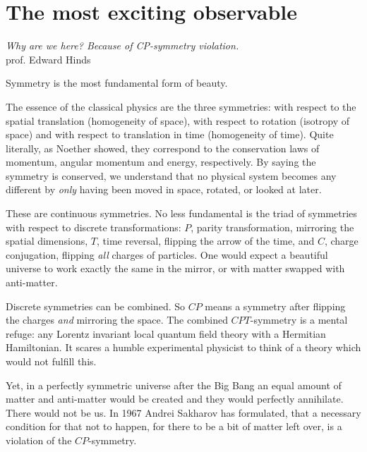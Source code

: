 \chapter{The most exciting observable}
\label{ch:nedm-at-psi}

\begin{center}
  \emph{Why are we here? Because of CP-symmetry violation.}\\
  prof. Edward Hinds
\end{center}

Symmetry is the most fundamental form of beauty.

The essence of the classical physics are the three symmetries: with respect to the spatial translation (homogeneity of space), with respect to rotation (isotropy of space) and with respect to translation in time (homogeneity of time). Quite literally, as Noether showed, they correspond to the conservation laws of momentum, angular momentum and energy, respectively. By saying the symmetry is conserved, we understand that no physical system becomes any different by \emph{only} having been moved in space, rotated, or looked at later.

These are continuous symmetries. No less fundamental is the triad of symmetries with respect to discrete transformations: $P$, parity transformation, mirroring the spatial dimensions, $T$, time reversal, flipping the arrow of the time, and $C$, charge conjugation, flipping \emph{all} charges of particles. One would expect a beautiful universe to work exactly the same in the mirror, or with matter swapped with anti-matter.

Discrete symmetries can be combined. So $CP$ means a symmetry after flipping the charges \emph{and} mirroring the space. The combined $CPT$-symmetry is a mental refuge: any Lorentz invariant local quantum field theory with a Hermitian Hamiltonian. It scares a humble experimental physicist to think of a theory which would not fulfill this.

Yet, in a perfectly symmetric universe after the Big Bang an equal amount of matter and anti-matter would be created and they would perfectly annihilate. There would not be us.
In 1967 Andrei Sakharov
has formulated, that a necessary condition for that not to happen, for there to be a bit of matter left over, is a violation of the $CP$-symmetry.

